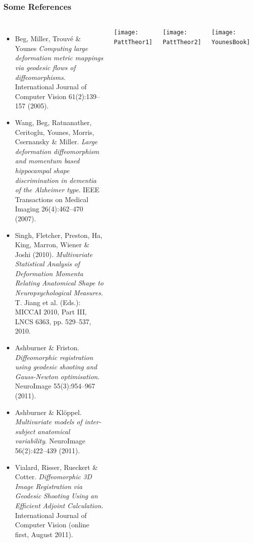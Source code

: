 \documentclass{beamer}
\begin{document}
\begin{frame}
\frametitle{Some References}
\begin{columns}[c]
\tiny{
\begin{itemize}
\item{Beg, Miller, Trouv{\'e} \& Younes  \emph{Computing large deformation metric mappings via geodesic flows of diffeomorphisms}.  International Journal of Computer Vision 61(2):139--157 (2005).}
\item{Wang, Beg, Ratnanather, Ceritoglu, Younes, Morris, Csernansky \& Miller. \emph{Large deformation diffeomorphism and momentum based hippocampal shape discrimination in dementia of the Alzheimer type}. IEEE Transactions on Medical Imaging 26(4):462--470 (2007).}
\item{Singh, Fletcher, Preston, Ha, King, Marron, Wiener \& Joshi (2010). \emph{Multivariate Statistical Analysis of Deformation Momenta Relating Anatomical Shape to Neuropsychological Measures}. T. Jiang et al. (Eds.): MICCAI 2010, Part III, LNCS 6363, pp. 529--537, 2010.}
\item{Ashburner \& Friston. \emph{Diffeomorphic registration using geodesic shooting and Gauss-Newton optimisation}. NeuroImage 55(3):954--967 (2011).}
\item{Ashburner \& Kl\"oppel. \emph{Multivariate models of inter-subject anatomical variability}.  NeuroImage 56(2):422--439 (2011).}
\item{Vialard, Risser, Rueckert \& Cotter. \emph{Diffeomorphic 3D Image Registration via Geodesic Shooting Using an Efficient Adjoint Calculation}. International Journal of Computer Vision (online first, August 2011).}
\end{itemize}
}
\texttt{[image: PattTheor1]}

\texttt{[image: PattTheor2]}

\texttt{[image: YounesBook]}

\end{columns}
\end{frame}



\end{document}
